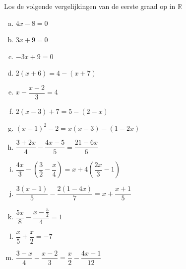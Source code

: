 \documentclass[12pt]{article}
\begin{document}
\begin{oefening}
  Los de volgende vergelijkingen van de eerste graad op in $\mathbb{R}$
  \begin{multicols}{2}
    \begin{enumerate}[(a)]
      \itemsep0.7em
    \item $4x-8=0$
    \item $3x+9=0$
    \item $-3x+9=0$
    \item $2(x+6)=4-(x+7)$
    \item $x - \dfrac{x-2}{3} = 4$
    \item $2(x-3)+7=5-(2-x)$
    \item $(x+1)^2-2=x(x-3)-(1-2x)$
    \item $\dfrac{3+2x}{4}-\dfrac{4x-5}{5}=\dfrac{21-6x}{6}$
    \item $\dfrac{4x}{3}-\left(\dfrac{3}{2}-\dfrac{x}{4}\right)=x+4\left(\dfrac{2x}{3}-1\right)$
    \item $\dfrac{3(x-1)}{5}-\dfrac{2(1-4x)}{7}=x+\dfrac{x+1}{5}$
    \item $\dfrac{5x}{8}-\dfrac{x-\frac{5}{2}}{4}=1$
    \item $\dfrac{x}{5}+\dfrac{x}{2}=-7$
    \item $\dfrac{3-x}{4}-\dfrac{x-2}{3}=\dfrac{x}{2}-\dfrac{4x+1}{12}$
    \end{enumerate}
  \end{multicols}
\end{oefening}
\end{document}
